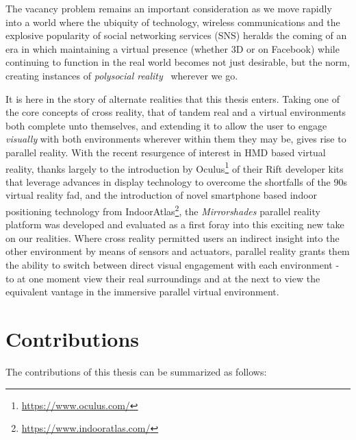 The vacancy problem remains an important consideration as we move rapidly into a world where the ubiquity of technology, wireless communications and the explosive popularity of social networking services (SNS) heralds the coming of an era in which maintaining a virtual presence (whether 3D or on Facebook) while continuing to function in the real world becomes not just desirable, but the norm, creating instances of \textit{polysocial reality}~\cite{Applin2012} wherever we go.

It is here in the story of alternate realities that this thesis enters. Taking one of the core concepts of cross reality, that of tandem real and a virtual environments both complete unto themselves, and extending it to allow the user to engage \textit{visually} with both environments wherever within them they may be, gives rise to parallel reality. With the recent resurgence of interest in HMD based virtual reality, thanks largely to the introduction by Oculus\footnote{\url{https://www.oculus.com/}} of their Rift developer kits that leverage advances in display technology to overcome the shortfalls of the 90s virtual reality fad, and the introduction of novel smartphone based indoor positioning technology from IndoorAtlas\footnote{\url{https://www.indooratlas.com/}}, the \textit{Mirrorshades} parallel reality platform was developed and evaluated as a first foray into this exciting new take on our realities. Where cross reality permitted users an indirect insight into the other environment by means of sensors and actuators, parallel reality grants them the ability to switch between direct visual engagement with each environment - to at one moment view their real surroundings and at the next to view the equivalent vantage in the immersive parallel virtual environment.


\section{Contributions}
\label{intro-contributions}
The contributions of this thesis can be summarized as follows:

